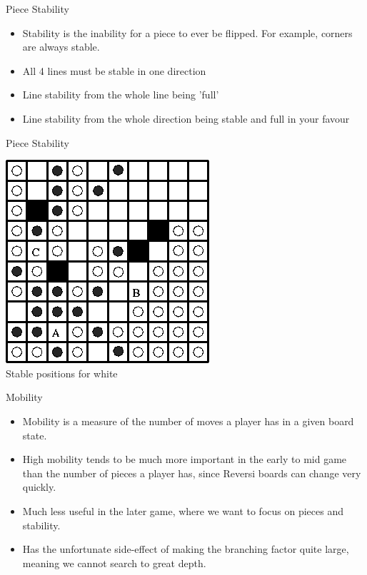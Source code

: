 \documentclass{beamer}
\begin{document}
\begin{frame}{Piece Stability}
    \begin{itemize}
  \item
  Stability is the inability for a piece to ever be flipped. For example, corners are always stable.
  \item
   All 4 lines must be stable in one direction
  \item
   Line stability from the whole line being 'full'
  \item
   Line stability from the whole direction being stable and full in your favour
  \end{itemize}

\end{frame}

\begin{frame}{Piece Stability}
\begin{center}
\includegraphics[scale=0.50]{stability.PNG}\\
Stable positions for white
\end{center}
\end{frame}

\begin{frame}{Mobility}
    \begin{itemize}
  \item
	Mobility is a measure of the number of moves a player has in a given board state.
  \item
	High mobility tends to be much more important in the early to mid game than the number of pieces a player has, since Reversi boards can change very quickly.
  \item
	Much less useful in the later game, where we want to focus on pieces and stability.
  \item
	Has the unfortunate side-effect of making the branching factor quite large, meaning we cannot search to great depth.
  \end{itemize}
\end{frame}
\end{document}

